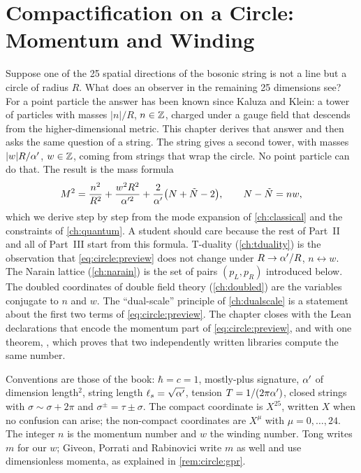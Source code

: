 \chapter{Compactification on a Circle: Momentum and Winding}\label{ch:circle}

Suppose one of the 25 spatial directions of the bosonic string is not a line but a circle of
radius $R$. What does an observer in the remaining 25 dimensions see? For a point particle the
answer has been known since Kaluza and Klein: a tower of particles with masses $|n|/R$,
$n\in\mathbb{Z}$, charged under a gauge field that descends from the higher-dimensional metric. This
chapter derives that answer and then asks the same question of a string. The string gives a
second tower, with masses $|w|R/\alpha'$, $w\in\mathbb{Z}$, coming from strings that wrap the circle. No
point particle can do that. The result is the mass formula
\begin{equation}\label{eq:circle:preview}
 M^2=\frac{n^2}{R^2}+\frac{w^2R^2}{\alpha'^2}+\frac{2}{\alpha'}\big(N+\tilde N-2\big),\qquad
 N-\tilde N=nw ,
\end{equation}
which we derive step by step from the mode expansion of \cref{ch:classical} and the constraints
of \cref{ch:quantum}. A student should care because the rest of Part~II and all of Part~III
start from this formula. T-duality (\cref{ch:tduality}) is the observation that
\eqref{eq:circle:preview} does not change under $R\to\alpha'/R$, $n\leftrightarrow w$. The Narain
lattice (\cref{ch:narain}) is the set of pairs $(p_L,p_R)$ introduced below. The doubled
coordinates of double field theory (\cref{ch:doubled}) are the variables conjugate to $n$ and
$w$. The ``dual-scale'' principle of \cref{ch:dualscale} is a statement about the first two
terms of \eqref{eq:circle:preview}. The chapter closes with the Lean declarations that encode
the momentum part of \eqref{eq:circle:preview}, and with one theorem, ,
which proves that two independently written libraries compute the same number.

Conventions are those of the book: $\hbar=c=1$, mostly-plus signature, $\alpha'$ of dimension
length$^2$, string length $\ell_s=\sqrt{\alpha'}$, tension $T=1/(2\pi\alpha')$, closed strings with
$\sigma\sim\sigma+2\pi$ and $\sigma^\pm=\tau\pm\sigma$. The compact coordinate is $X^{25}$,
written $X$ when no confusion can arise; the non-compact coordinates are $X^\mu$ with
$\mu=0,\dots,24$. The integer $n$ is the momentum number and $w$ the winding number. Tong
writes $m$ for our $w$; Giveon, Porrati and Rabinovici write $m$ as well and use dimensionless
momenta, as explained in \cref{rem:circle:gpr}.

